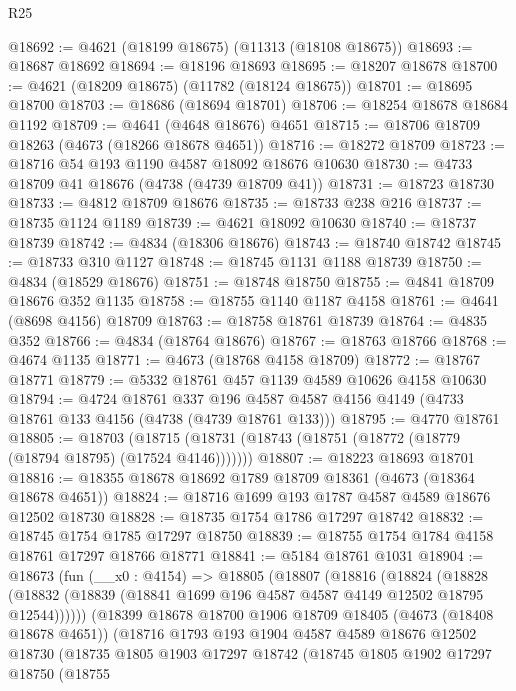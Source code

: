 \begin{lexlean}{R25}
\begin{coremodule}
@18692 := @4621 (@18199 @18675) (@11313 (@18108 @18675))
@18693 := @18687 @18692
@18694 := @18196 @18693
@18695 := @18207 @18678
@18700 := @4621 (@18209 @18675) (@11782 (@18124 @18675))
@18701 := @18695 @18700
@18703 := @18686 (@18694 @18701)
@18706 := @18254 @18678 @18684 @1192
@18709 := @4641 (@4648 @18676) @4651
@18715 := @18706 @18709 @18263 (@4673 (@18266 @18678 @4651))
@18716 := @18272 @18709
@18723 := @18716 @54 @193 @1190 @4587 @18092 @18676 @10630
@18730 := @4733 @18709 @41 @18676 (@4738 (@4739 @18709 @41))
@18731 := @18723 @18730
@18733 := @4812 @18709 @18676
@18735 := @18733 @238 @216
@18737 := @18735 @1124 @1189
@18739 := @4621 @18092 @10630
@18740 := @18737 @18739
@18742 := @4834 (@18306 @18676)
@18743 := @18740 @18742
@18745 := @18733 @310 @1127
@18748 := @18745 @1131 @1188 @18739
@18750 := @4834 (@18529 @18676)
@18751 := @18748 @18750
@18755 := @4841 @18709 @18676 @352 @1135
@18758 := @18755 @1140 @1187 @4158
@18761 := @4641 (@8698 @4156) @18709
@18763 := @18758 @18761 @18739
@18764 := @4835 @352
@18766 := @4834 (@18764 @18676)
@18767 := @18763 @18766
@18768 := @4674 @1135
@18771 := @4673 (@18768 @4158 @18709)
@18772 := @18767 @18771
@18779 := @5332 @18761 @457 @1139 @4589 @10626 @4158 @10630
@18794 := @4724
    @18761
    @337
    @196
    @4587
    @4587
    @4156
    @4149
    (@4733 @18761 @133 @4156 (@4738 (@4739 @18761 @133)))
@18795 := @4770 @18761
@18805 := @18703
    (@18715 (@18731 (@18743 (@18751 (@18772 (@18779 (@18794 @18795) (@17524 @4146)))))))
@18807 := @18223 @18693 @18701
@18816 := @18355 @18678 @18692 @1789 @18709 @18361 (@4673 (@18364 @18678 @4651))
@18824 := @18716 @1699 @193 @1787 @4587 @4589 @18676 @12502 @18730
@18828 := @18735 @1754 @1786 @17297 @18742
@18832 := @18745 @1754 @1785 @17297 @18750
@18839 := @18755 @1754 @1784 @4158 @18761 @17297 @18766 @18771
@18841 := @5184 @18761 @1031
@18904 := @18673
    (fun (__x0 : @4154) =>
    @18805
      (@18807
        (@18816
          (@18824
            (@18828 (@18832 (@18839 (@18841 @1699 @196 @4587 @4587 @4149 @12502 @18795 @12544))))))
        (@18399
          @18678
          @18700
          @1906
          @18709
          @18405
          (@4673 (@18408 @18678 @4651))
          (@18716
            @1793
            @193
            @1904
            @4587
            @4589
            @18676
            @12502
            @18730
            (@18735
              @1805
              @1903
              @17297
              @18742
              (@18745
                @1805
                @1902
                @17297
                @18750
                (@18755

\end{coremodule}
\end{lexlean}
